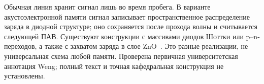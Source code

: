 Обычная линия хранит сигнал лишь во время пробега. В варианте акустоэлектронной памяти сигнал записывает пространственное распределение заряда в диодной структуре; оно сохраняется после прохода волны и считывается следующей ПАВ. Существуют конструкции с массивами диодов Шоттки или p--n-переходов, а также с захватом заряда в слое ZnO~\cite{weng}. Это разные реализации, не универсальная схема любой памяти. Проверена первичная университетская аннотация Weng; полный текст и точная кафедральная конструкция не установлены.
